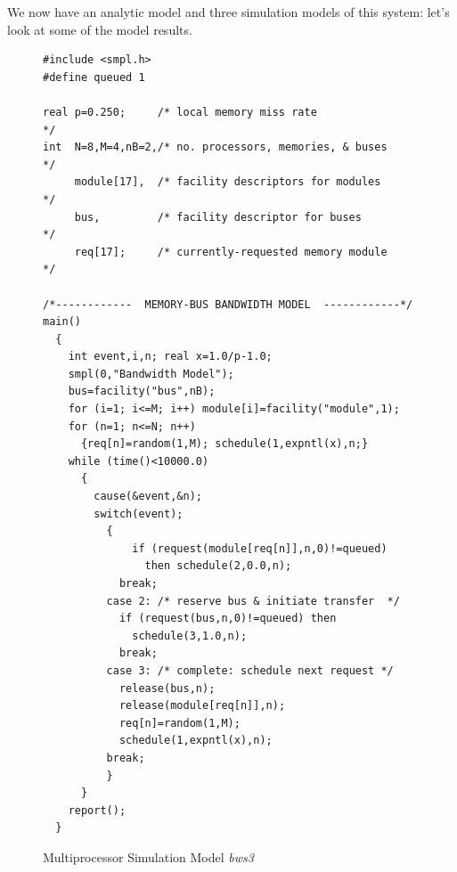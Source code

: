 We now have an analytic model and three simulation models of this
system: let's look at some of the model results.
\begin{figure}[H]
\centering
\begin{minipage}{.98\textwidth}
\begin{lstlisting}[basicstyle=\ttfamily\scriptsize]
#include <smpl.h>
#define queued 1

real p=0.250;     /* local memory miss rate                */
int  N=8,M=4,nB=2,/* no. processors, memories, & buses     */
     module[17],  /* facility descriptors for modules      */
     bus,         /* facility descriptor for buses         */
     req[17];     /* currently-requested memory module     */

/*------------  MEMORY-BUS BANDWIDTH MODEL  ------------*/
main()
  {
    int event,i,n; real x=1.0/p-1.0;
    smpl(0,"Bandwidth Model");
    bus=facility("bus",nB);
    for (i=1; i<=M; i++) module[i]=facility("module",1);
    for (n=1; n<=N; n++)
      {req[n]=random(1,M); schedule(1,expntl(x),n;}
    while (time()<10000.0)
      {
        cause(&event,&n);
        switch(event);
          {
              if (request(module[req[n]],n,0)!=queued)
                then schedule(2,0.0,n);
            break;
          case 2: /* reserve bus & initiate transfer  */
            if (request(bus,n,0)!=queued) then
              schedule(3,1.0,n);
            break;
          case 3: /* complete: schedule next request */
            release(bus,n);
            release(module[req[n]],n);
            req[n]=random(1,M);
            schedule(1,expntl(x),n);
          break;
          }
      }
    report();
  }
\end{lstlisting}
\end{minipage}
\caption{Multiprocessor Simulation Model \emph{bws3}}
\end{figure}
